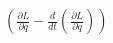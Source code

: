 \documentclass[preview]{standalone}
\begin{document}
\begin{center}
$\left( \frac{\partial L}{\partial q} - \frac{d}{dt} \left( \frac{\partial L}{\partial \dot{q}} \right) \right)$
\end{center}
\end{document}
